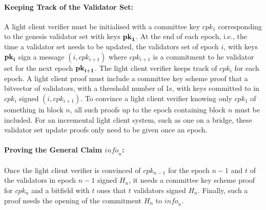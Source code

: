 \noindent\paragraph{Keeping Track of the Validator Set:} A light client verifier must be initialised with a committee key $cpk_1$ corresponding to the genesis validator set with keys $\bf{pk}_1$. At the end of each epoch, i.e., the time a validator set needs to be updated, the validators set of epoch $i$, with keys $\bf{pk}_i$ sign a message $(i,cpk_{i+1})$ where $cpk_{i+1}$ is a commitment to he validator set for the next epoch $\bf{pk}_{i+1}$. The light client verifier keeps track of $cpk_i$ for each epoch. A light client proof must include a committee key scheme proof that a bitvector of validators, with a threshold number of 1s, with keys committed to in $cpk_i$ signed $(i,cpk_{i+1})$. To convince a light client verifier knowing only $cpk_1$ of something in block $n$, all such proofs up to the epoch containing block $n$ must be included. For an incremental light client system, such as one on a bridge, these validator set update proofs only need to be given once an epoch.
\vspace{-0.05in}

\noindent\paragraph{Proving the General Claim $\mathit{info}_n$:} Once the light client verifier is convinced of $cpk_{n-1}$ for the epoch $n-1$ and $t$ of the validators in epoch $n-1$ signed $H_n$, it needs a committee key scheme proof for $cpk_n$ and a bitfield with $t$ ones that $t$ validators signed $H_n$. Finally, such a proof needs the opening of the commitment $H_n$ to $\mathit{info}_n$.
\vspace{-0.08in}

